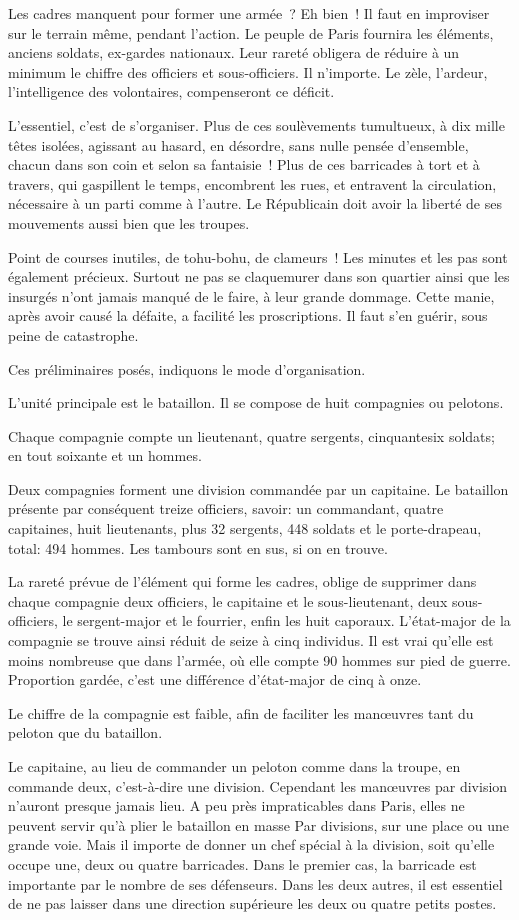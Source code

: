 \documentclass[french,twoside]{book} %
\begin{document}
Les cadres manquent pour former une armée ? Eh bien ! Il faut en improviser sur le terrain même, pendant l’action. Le peuple de Paris fournira les éléments, anciens soldats, ex-gardes nationaux. Leur rareté obligera de réduire à un minimum le chiffre des officiers et sous-officiers. Il n’importe. Le zèle, l’ardeur, l’intelligence des volontaires, compenseront ce déficit.\par
L'essentiel, c’est de s’organiser. Plus de ces soulèvements tumultueux, à dix mille têtes isolées, agissant au hasard, en désordre, sans nulle pensée d’ensemble, chacun dans son coin et selon sa fantaisie ! Plus de ces barricades à tort et à travers, qui gaspillent le temps, encombrent les rues, et entravent la circulation, nécessaire à un parti comme à l’autre. Le Républicain doit avoir la liberté de ses mouvements aussi bien que les troupes.\par
Point de courses inutiles, de tohu-bohu, de clameurs ! Les minutes et les pas sont également précieux. Surtout ne pas se claquemurer dans son quartier ainsi que les insurgés n’ont jamais manqué de le faire, à leur grande dommage. Cette manie, après avoir causé la défaite, a facilité les proscriptions. Il faut s’en guérir, sous peine de catastrophe.\par
Ces préliminaires posés, indiquons le mode d’organisation.\par
L'unité principale est le bataillon. Il se compose de huit compagnies ou pelotons.\par
Chaque compagnie compte un lieutenant, quatre sergents, cinquantesix soldats; en tout soixante et un hommes.\par
Deux compagnies forment une division commandée par un capitaine. Le bataillon présente par conséquent treize officiers, savoir: un commandant, quatre capitaines, huit lieutenants, plus 32 sergents, 448 soldats et le porte-drapeau, total: 494 hommes. Les tambours sont en sus, si on en trouve.\par
La rareté prévue de l’élément qui forme les cadres, oblige de supprimer dans chaque compagnie deux officiers, le capitaine et le sous-lieutenant, deux sous-officiers, le sergent-major et le fourrier, enfin les huit caporaux. L'état-major de la compagnie se trouve ainsi réduit de seize à cinq individus. Il est vrai qu’elle est moins nombreuse que dans l’armée, où elle compte 90 hommes sur pied de guerre. Proportion gardée, c’est une différence d’état-major de cinq à onze.\par
Le chiffre de la compagnie est faible, afin de faciliter les manœuvres tant du peloton que du bataillon.\par
Le capitaine, au lieu de commander un peloton comme dans la troupe, en commande deux, c’est-à-dire une division. Cependant les manœuvres par division n’auront presque jamais lieu. A peu près impraticables dans Paris, elles ne peuvent servir qu’à plier le bataillon en masse Par divisions, sur une place ou une grande voie. Mais il importe de donner un chef spécial à la division, soit qu’elle occupe une, deux ou quatre barricades. Dans le premier cas, la barricade est importante par le nombre de ses défenseurs. Dans les deux autres, il est essentiel de ne pas laisser dans une direction supérieure les deux ou quatre petits postes.
\end{document}
